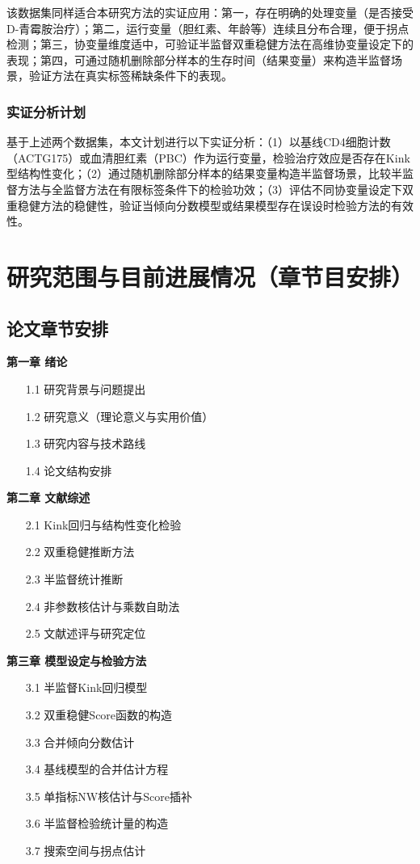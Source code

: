 \documentclass[12pt,a4paper]{ctexart}
\begin{document}
该数据集同样适合本研究方法的实证应用：第一，存在明确的处理变量（是否接受D-青霉胺治疗）；第二，运行变量（胆红素、年龄等）连续且分布合理，便于拐点检测；第三，协变量维度适中，可验证半监督双重稳健方法在高维协变量设定下的表现；第四，可通过随机删除部分样本的生存时间（结果变量）来构造半监督场景，验证方法在真实标签稀缺条件下的表现。

\subsubsection{实证分析计划}

基于上述两个数据集，本文计划进行以下实证分析：（1）以基线CD4细胞计数（ACTG175）或血清胆红素（PBC）作为运行变量，检验治疗效应是否存在Kink型结构性变化；（2）通过随机删除部分样本的结果变量构造半监督场景，比较半监督方法与全监督方法在有限标签条件下的检验功效；（3）评估不同协变量设定下双重稳健方法的稳健性，验证当倾向分数模型或结果模型存在误设时检验方法的有效性。

\section{研究范围与目前进展情况（章节目安排）}

\subsection{论文章节安排}

\textbf{第一章 绪论}
\begin{itemize}[leftmargin=2em]
\item[1.1] 研究背景与问题提出
\item[1.2] 研究意义（理论意义与实用价值）
\item[1.3] 研究内容与技术路线
\item[1.4] 论文结构安排
\end{itemize}

\textbf{第二章 文献综述}
\begin{itemize}[leftmargin=2em]
\item[2.1] Kink回归与结构性变化检验
\item[2.2] 双重稳健推断方法
\item[2.3] 半监督统计推断
\item[2.4] 非参数核估计与乘数自助法
\item[2.5] 文献述评与研究定位
\end{itemize}

\textbf{第三章 模型设定与检验方法}
\begin{itemize}[leftmargin=2em]
\item[3.1] 半监督Kink回归模型
\item[3.2] 双重稳健Score函数的构造
\item[3.3] 合并倾向分数估计
\item[3.4] 基线模型的合并估计方程
\item[3.5] 单指标NW核估计与Score插补
\item[3.6] 半监督检验统计量的构造
\item[3.7] 搜索空间与拐点估计
\end{itemize}
\end{document}
